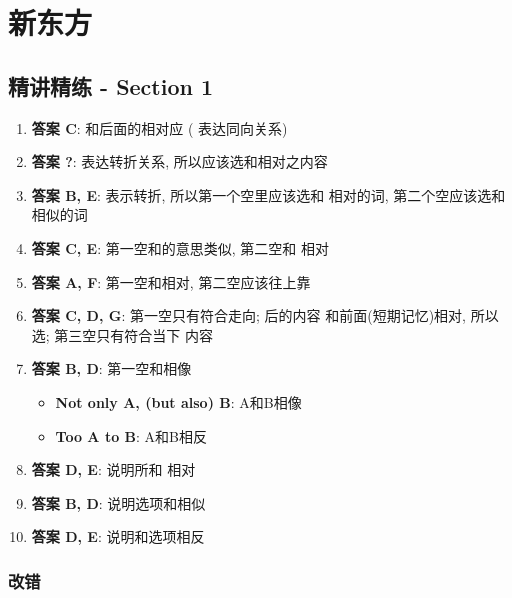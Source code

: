 \chapter{新东方}

\section{精讲精练 - Section 1}

  \begin{enumerate}
    \item \textbf{答案 C}: 和后面的相对应 (
    表达同向关系)
    \item \textbf{答案 ?}:  表达转折关系, 所以应该选和相对之内容
    \item \textbf{答案 B, E}: 表示转折, 所以第一个空里应该选和
    相对的词, 第二个空应该选和相似的词
    \item \textbf{答案 C, E}: 第一空和的意思类似, 第二空和
    相对
    \item \textbf{答案 A, F}: 第一空和相对, 第二空应该往上靠
    \item \textbf{答案 C, D, G}: 第一空只有符合走向;  后的内容
    和前面(短期记忆)相对, 所以选; 第三空只有符合当下
    内容
    \item \textbf{答案 B, D}: 第一空和相像
    \begin{itemize}
      \item \textbf{Not only A, (but also) B}: A和B相像
      \item \textbf{Too A to B}: A和B相反
    \end{itemize}

    \item \textbf{答案 D, E}: 说明所和
    相对
    \item \textbf{答案 B, D}: 说明选项和相似
    \item \textbf{答案 D, E}: 说明和选项相反
  \end{enumerate}

  \subsection{改错}

